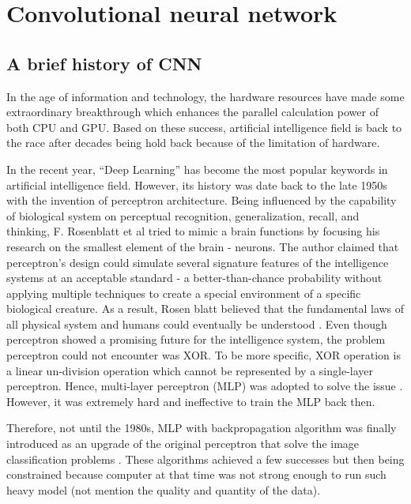 	
	

\section{Convolutional neural network}
\subsection{A brief history of CNN}

\noindent

	In the age of information and technology, the hardware resources have made some extraordinary breakthrough which enhances the parallel calculation power of both CPU and GPU. Based on these success, artificial intelligence field is back to the race after decades being hold back because of the limitation of hardware.

	In the recent year, “Deep Learning” has become the most popular keywords in artificial intelligence field. However, its history was date back to the late 1950s with the invention of perceptron architecture. Being influenced by the capability of biological system on perceptual recognition, generalization, recall, and thinking, F. Rosenblatt et al tried to mimic a brain functions by focusing his research on the smallest element of the brain - neurons. The author claimed that perceptron’s design could simulate several signature features of the intelligence systems at an acceptable standard - a better-than-chance probability without applying multiple techniques to create a special environment of a specific biological creature. As a result, Rosen blatt believed that the fundamental laws of all physical system and humans could eventually be understood \cite{perceptron}.
	Even though perceptron showed a promising future for the intelligence system, the problem perceptron could not encounter was XOR. To be more specific, XOR operation is a linear un-division operation which cannot be represented by a single-layer perceptron. Hence, multi-layer perceptron (MLP) was adopted to solve the issue \cite{xorproblem}. However, it was extremely hard and ineffective to train the MLP back then.
	
	Therefore, not until the 1980s, MLP with backpropagation algorithm was finally introduced as an upgrade of the original perceptron that solve the image classification problems \cite{backpropagation}. These algorithms achieved a few successes but then being constrained because computer at that time was not strong enough to run such heavy model (not mention the quality and quantity of the data). 
	

